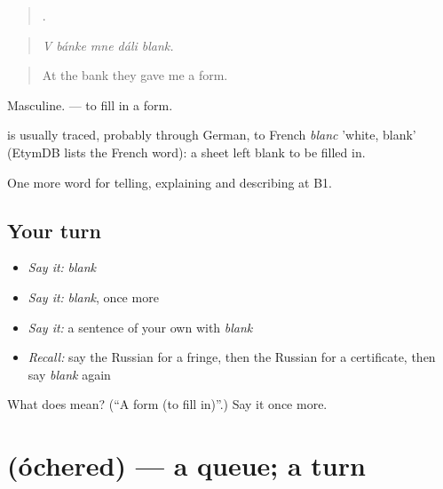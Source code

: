 \begin{quote}
    .
\end{quote}

\begin{quote}
\emph{V bánke mne dáli blank.}
\end{quote}

\begin{quote}
At the bank they gave me a form.
\end{quote}

Masculine. \emph{ } — to fill in a form.

\begin{cousinweb}
\emph{} is usually traced, probably through German, to French \emph{blanc} 'white, blank' (EtymDB lists the French word): a sheet left blank to be filled in.
\end{cousinweb}

\begin{grammarlens}[title={What you've built}]
One more word for telling, explaining and describing at B1.
\end{grammarlens}

\subsection*{Your turn}
\begin{itemize}
\raggedright
  \item \emph{Say it:} \emph{blank}
  \item \emph{Say it:} \emph{blank}, once more
  \item \emph{Say it:} a sentence of your own with \emph{blank}
  \item \emph{Recall:} say the Russian for a fringe, then the Russian for a certificate, then say \emph{blank} again
\end{itemize}

\begin{tcolorbox}[breakable,colback=teal!4,colframe=teal!35!black,title={Before you move on}]
What does  mean? (\textquotedblleft{}A form (to fill in)\textquotedblright{}.) Say it once more.
\end{tcolorbox}
\section[\texorpdfstring{\ru{очередь} (óchered)}{очередь (óchered)}]{ (óchered) — a queue; a turn}

